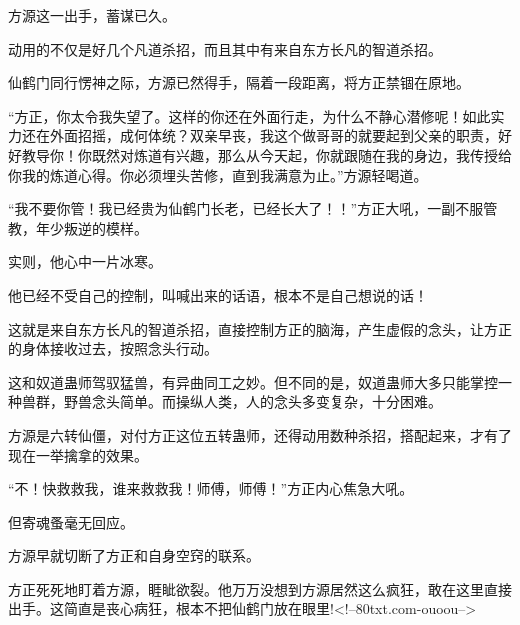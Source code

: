 \begin{this_body}
方源这一出手，蓄谋已久。

动用的不仅是好几个凡道杀招，而且其中有来自东方长凡的智道杀招。

仙鹤门同行愣神之际，方源已然得手，隔着一段距离，将方正禁锢在原地。

“方正，你太令我失望了。这样的你还在外面行走，为什么不静心潜修呢！如此实力还在外面招摇，成何体统？双亲早丧，我这个做哥哥的就要起到父亲的职责，好好教导你！你既然对炼道有兴趣，那么从今天起，你就跟随在我的身边，我传授给你我的炼道心得。你必须埋头苦修，直到我满意为止。”方源轻喝道。

“我不要你管！我已经贵为仙鹤门长老，已经长大了！！”方正大吼，一副不服管教，年少叛逆的模样。

实则，他心中一片冰寒。

他已经不受自己的控制，叫喊出来的话语，根本不是自己想说的话！

这就是来自东方长凡的智道杀招，直接控制方正的脑海，产生虚假的念头，让方正的身体接收过去，按照念头行动。

这和奴道蛊师驾驭猛兽，有异曲同工之妙。但不同的是，奴道蛊师大多只能掌控一种兽群，野兽念头简单。而操纵人类，人的念头多变复杂，十分困难。

方源是六转仙僵，对付方正这位五转蛊师，还得动用数种杀招，搭配起来，才有了现在一举擒拿的效果。

“不！快救救我，谁来救救我！师傅，师傅！”方正内心焦急大吼。

但寄魂蚤毫无回应。

方源早就切断了方正和自身空窍的联系。

方正死死地盯着方源，睚眦欲裂。他万万没想到方源居然这么疯狂，敢在这里直接出手。这简直是丧心病狂，根本不把仙鹤门放在眼里!<!--80txt.com-ouoou-->

\end{this_body}

